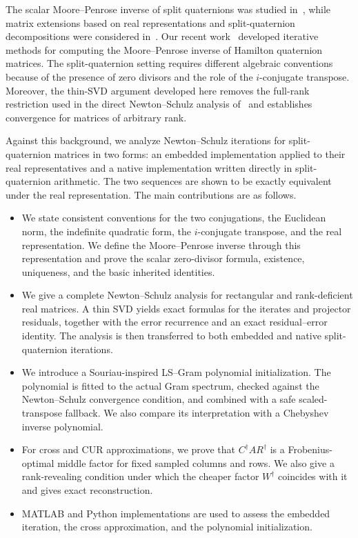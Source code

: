 \documentclass[12pt,a4paper]{article}
\theoremstyle{plain}
\theoremstyle{definition}
\theoremstyle{remark}
\begin{document}
The scalar Moore--Penrose inverse of split quaternions was studied
in~\cite{ablamowicz2020moore,cao2022moore}, while matrix extensions based
on real representations and split-quaternion decompositions were considered
in~\cite{wang2024singular}. Our recent work~\cite{leplat2025iterative}
developed iterative methods for computing the Moore--Penrose inverse of
Hamilton quaternion matrices. The split-quaternion setting requires
different algebraic conventions because of the presence of zero divisors
and the role of the \(i\)-conjugate transpose. Moreover, the thin-SVD
argument developed here removes the full-rank restriction used in the
direct Newton--Schulz analysis of~\cite{leplat2025iterative} and
establishes convergence for matrices of arbitrary rank.

Against this background, we analyze Newton--Schulz iterations for
split-quaternion matrices in two forms: an embedded implementation applied
to their real representatives and a native implementation written directly
in split-quaternion arithmetic. The two sequences are shown to be exactly
equivalent under the real representation. The main contributions are as
follows.

\begin{itemize}
    \item We state consistent conventions for the two conjugations, the Euclidean norm, the indefinite quadratic form, the \(i\)-conjugate transpose, and the real representation. We define the Moore--Penrose inverse through this representation and prove the scalar zero-divisor formula, existence, uniqueness, and the basic inherited identities.

    \item We give a complete Newton--Schulz analysis for rectangular and rank-deficient real matrices. A thin SVD yields exact formulas for the iterates and projector residuals, together with the error recurrence and an exact residual--error identity. The analysis is then transferred to both embedded and native split-quaternion iterations.

    \item We introduce a Souriau-inspired LS--Gram polynomial initialization. The polynomial is fitted to the actual Gram spectrum, checked against the Newton--Schulz convergence condition, and combined with a safe scaled-transpose fallback. We also compare its interpretation with a Chebyshev inverse polynomial.

    \item For cross and CUR approximations, we prove that \(C^\dagger A R^\dagger\) is a Frobenius-optimal middle factor for fixed sampled columns and rows. We also give a rank-revealing condition under which the cheaper factor \(W^\dagger\) coincides with it and gives exact reconstruction.

    \item MATLAB and Python implementations are used to assess the embedded iteration, the cross approximation, and the polynomial initialization.
\end{itemize}
\end{document}
